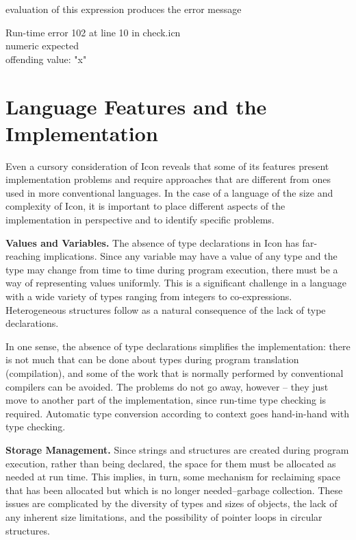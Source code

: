 
\noindent
evaluation of this expression produces the error message

\begin{iconcode}
\>Run-time error 102 at line 10 in check.icn\\
\>numeric expected\\
\>offending value: "x"
\end{iconcode}

\section{Language Features and the Implementation}

Even a cursory consideration of Icon reveals that some of its features
present implementation problems and require approaches that are
different from ones used in more conventional languages. In the case
of a language of the size and complexity of Icon, it is important to
place different aspects of the implementation in perspective and to
identify specific problems.


\textbf{Values and Variables.} The absence of type declarations in
Icon has far-reaching implications. Since any variable may have a
value of any type and the type may change from time to time during
program execution, there must be a way of representing values
uniformly. This is a significant challenge in a language with a wide
variety of types ranging from integers to
co-expressions. Heterogeneous structures follow as a natural
consequence of the lack of type declarations.

In one sense, the absence of type declarations simplifies the
implementation: there is not much that can be done about types during
program translation (compilation), and some of the work that is
normally performed by conventional compilers can be avoided. The
problems do not go away, however -- they just move to another part of
the implementation, since run-time type checking is
required. Automatic type conversion according to context goes
hand-in-hand with type checking.


\textbf{Storage Management.} Since strings and structures are created
during program execution, rather than being declared, the space for
them must be allocated as needed at run time. This implies, in turn,
some mechanism for reclaiming space that has been allocated but which
is no longer needed--{\textquotedbl}garbage collection.{\textquotedbl}
These issues are complicated by the diversity of types and sizes of
objects, the lack of any inherent size limitations, and the
possibility of pointer loops in circular structures.


